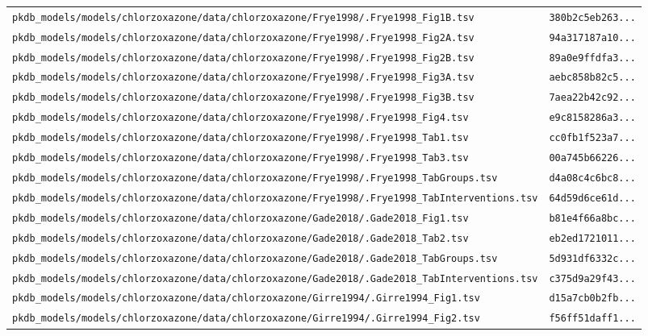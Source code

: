 \begin{longtable}{ll}
\texttt{pkdb\_models/models/chlorzoxazone/data/chlorzoxazone/Frye1998/.Frye1998\_Fig1B.tsv} & \texttt{380b2c5eb263...} \\
\texttt{pkdb\_models/models/chlorzoxazone/data/chlorzoxazone/Frye1998/.Frye1998\_Fig2A.tsv} & \texttt{94a317187a10...} \\
\texttt{pkdb\_models/models/chlorzoxazone/data/chlorzoxazone/Frye1998/.Frye1998\_Fig2B.tsv} & \texttt{89a0e9ffdfa3...} \\
\texttt{pkdb\_models/models/chlorzoxazone/data/chlorzoxazone/Frye1998/.Frye1998\_Fig3A.tsv} & \texttt{aebc858b82c5...} \\
\texttt{pkdb\_models/models/chlorzoxazone/data/chlorzoxazone/Frye1998/.Frye1998\_Fig3B.tsv} & \texttt{7aea22b42c92...} \\
\texttt{pkdb\_models/models/chlorzoxazone/data/chlorzoxazone/Frye1998/.Frye1998\_Fig4.tsv} & \texttt{e9c8158286a3...} \\
\texttt{pkdb\_models/models/chlorzoxazone/data/chlorzoxazone/Frye1998/.Frye1998\_Tab1.tsv} & \texttt{cc0fb1f523a7...} \\
\texttt{pkdb\_models/models/chlorzoxazone/data/chlorzoxazone/Frye1998/.Frye1998\_Tab3.tsv} & \texttt{00a745b66226...} \\
\texttt{pkdb\_models/models/chlorzoxazone/data/chlorzoxazone/Frye1998/.Frye1998\_TabGroups.tsv} & \texttt{d4a08c4c6bc8...} \\
\texttt{pkdb\_models/models/chlorzoxazone/data/chlorzoxazone/Frye1998/.Frye1998\_TabInterventions.tsv} & \texttt{64d59d6ce61d...} \\
\texttt{pkdb\_models/models/chlorzoxazone/data/chlorzoxazone/Gade2018/.Gade2018\_Fig1.tsv} & \texttt{b81e4f66a8bc...} \\
\texttt{pkdb\_models/models/chlorzoxazone/data/chlorzoxazone/Gade2018/.Gade2018\_Tab2.tsv} & \texttt{eb2ed1721011...} \\
\texttt{pkdb\_models/models/chlorzoxazone/data/chlorzoxazone/Gade2018/.Gade2018\_TabGroups.tsv} & \texttt{5d931df6332c...} \\
\texttt{pkdb\_models/models/chlorzoxazone/data/chlorzoxazone/Gade2018/.Gade2018\_TabInterventions.tsv} & \texttt{c375d9a29f43...} \\
\texttt{pkdb\_models/models/chlorzoxazone/data/chlorzoxazone/Girre1994/.Girre1994\_Fig1.tsv} & \texttt{d15a7cb0b2fb...} \\
\texttt{pkdb\_models/models/chlorzoxazone/data/chlorzoxazone/Girre1994/.Girre1994\_Fig2.tsv} & \texttt{f56ff51daff1...} \\

\end{longtable}
